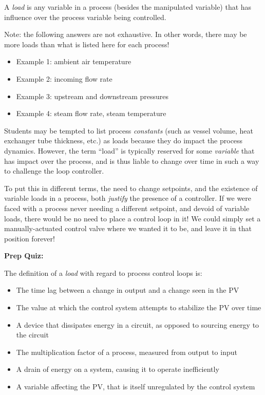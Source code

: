 
A {\it load} is any variable in a process (besides the manipulated variable) that has influence over the process variable being controlled.

\vskip 10pt

Note: the following answers are not exhaustive.  In other words, there may be more loads than what is listed here for each process!

\begin{itemize}
\item{} Example 1: ambient air temperature
\item{} Example 2: incoming flow rate
\item{} Example 3: upstream and downstream pressures
\item{} Example 4: steam flow rate, steam temperature
\end{itemize}







Students may be tempted to list process {\it constants} (such as vessel volume, heat exchanger tube thickness, etc.) as loads because they do impact the process dynamics.  However, the term ``load'' is typically reserved for some {\it variable} that has impact over the process, and is thus liable to change over time in such a way to challenge the loop controller.

To put this in different terms, the need to change setpoints, and the existence of variable loads in a process, both {\it justify} the presence of a controller.  If we were faced with a process never needing a different setpoint, and devoid of variable loads, there would be no need to place a control loop in it!  We could simply set a manually-actuated control valve where we wanted it to be, and leave it in that position forever!

\vfil \eject

\noindent
{\bf Prep Quiz:}

The definition of a {\it load} with regard to process control loops is:

\begin{itemize}
\item{} The time lag between a change in output and a change seen in the PV
\vskip 5pt 
\item{} The value at which the control system attempts to stabilize the PV over time
\vskip 5pt 
\item{} A device that dissipates energy in a circuit, as opposed to sourcing energy to the circuit
\vskip 5pt 
\item{} The multiplication factor of a process, measured from output to input
\vskip 5pt 
\item{} A drain of energy on a system, causing it to operate inefficiently
\vskip 5pt 
\item{} A variable affecting the PV, that is itself unregulated by the control system
\end{itemize}






